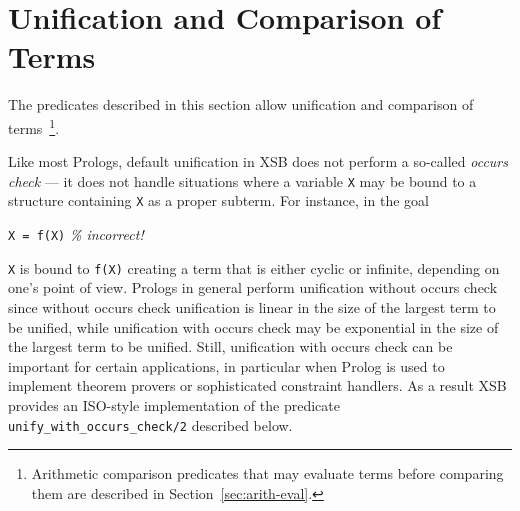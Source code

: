 \section{Unification and Comparison of Terms} \label{Comparison}

The predicates described in this section allow unification and
comparison of terms~\footnote{Arithmetic comparison predicates that
may evaluate terms before comparing them are described in
Section~\ref{sec:arith-eval}.}.

Like most Prologs, default unification in XSB does not perform a
so-called {\em occurs check} --- it does not handle situations where a
variable {\tt X} may be bound to a structure containing {\tt X} as a
proper subterm.  For instance, in the goal

{\tt X = f(X)}    {\em \% incorrect!}

{\tt X} is bound to {\tt f(X)} creating a term that is either cyclic
or infinite, depending on one's point of view.  Prologs in general
perform unification without occurs check since without occurs check
unification is linear in the size of the largest term to be unified,
while unification with occurs check may be exponential in the size of
the largest term to be unified.  Still, unification with occurs check
can be important for certain applications, in particular when Prolog
is used to implement theorem provers or sophisticated constraint
handlers.  As a result XSB provides an ISO-style implementation of the
predicate {\tt unify\_with\_occurs\_check/2} described below.

